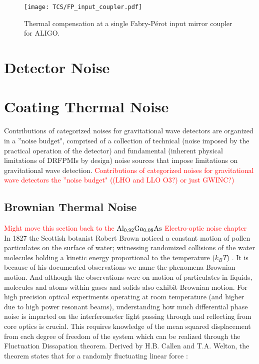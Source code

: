 {\begin{figure}[H]
	\texttt{[image: TCS/FP\_input\_coupler.pdf]}
\caption{Thermal compensation at a single Fabry-P\'{e}rot input mirror coupler for ALIGO.}
 \label{fig:meas}
\end{figure}

\section{Detector Noise}

\section{Coating Thermal Noise}
Contributions of categorized noises for gravitational wave detectors are organized in a ''noise budget", comprised of a collection of technical (noise imposed by the practical operation of the detector) and fundamental (inherent physical limitations of DRFPMIs by design) noise sources that impose limitations on gravitational wave detection.
\textcolor{red}{Contributions of categorized noises for gravitational wave detectors the ''noise budget" ((LHO and LLO O3?) or just GWINC?)}

\subsection{Brownian Thermal Noise}
\textcolor{red}{Might move this section back to the $\mathrm{Al_{0.92}Ga_{0.08}As}$ Electro-optic noise chapter}
\\
In 1827 the Scottish botanist Robert Brown noticed a constant motion of pollen particulates on the surface of water; witnessing randomized collisions of the water molecules holding a kinetic energy proportional to the temperature ($k_BT$) \cite{Brown:1828}. It is because of his documented observations we name the phenomena Brownian motion. And although the observations were on motion of particulates in liquids, molecules and atoms within gases and solids also exhibit Brownian motion. For high precision optical experiments operating at room temperature (and higher due to high power resonant beams), understanding how much differential phase noise is imparted on the interferometer light passing through and reflecting from core optics is crucial. This requires knowledge of the mean squared displacement from each degree of freedom of the system which can be realized through the Fluctuation Dissapation theorem. Derived by H.B. Callen and T.A. Welton, the theorem states that for a randomly fluctuating linear force \cite{Callen:1951}:

}
